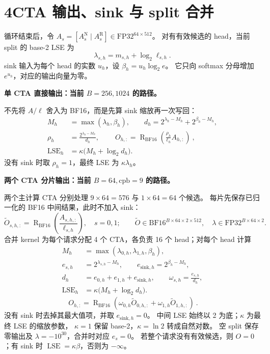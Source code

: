 \documentclass[UTF8,fontset=fandol,a4paper,10pt]{ctexart}
\newcommand{\BF}{\mathrm{BF16}}
\newcommand{\FP}{\mathrm{FP32}}
\newcommand{\RN}{\operatorname{R}_{\BF}}
\newcommand{\N}{\mathrm{N}}
\newcommand{\R}{\mathrm{R}}
\newcommand{\lse}{\operatorname{LSE}}
\begin{document}
\section*{4\quad CTA 输出、sink 与 split 合并}

循环结束后，令 $A_s=[A_s^{\N}\mid A_s^{\R}]\in\FP^{64\times512}$。
对有有效候选的 head，当前 split 的 base-2 LSE 为
\[
  \lambda_{s,h}=m_{s,h}+\log_2\ell_{s,h}.
\]
sink 输入为每个 head 的实数 $u_h$，设 $\beta_h=u_h\log_2e$。
它只向 softmax 分母增加 $e^{u_h}$，对应的输出向量为零。

\textbf{单 CTA 直接输出：当前 $B=256,1024$ 的路径。}

不先将 $A/\ell$ 舍入为 BF16，而是先算 sink 缩放再一次写回：
\begin{align*}
  M_h&=\max(\lambda_h,\beta_h),\qquad
  d_h=2^{\lambda_h-M_h}+2^{\beta_h-M_h},\\
  \rho_h&=\frac{2^{\lambda_h-M_h}}{d_h},\qquad
  \boxed{\ O_{h,:}=\RN\!\left(\frac{\rho_h}{\ell_h}A_{h,:}\right)\ },\\
  \lse_h&=\kappa\bigl(M_h+\log_2 d_h\bigr).
\end{align*}
没有 sink 时取 $\rho_h=1$，最终 LSE 为 $\kappa\lambda_h$。

\textbf{两个 CTA 分片输出：当前 $B=64,\mathrm{cpb}=9$ 的路径。}

两个主计算 CTA 分别处理 $9\times64=576$ 与 $1\times64=64$ 个候选。
每片先保存已归一化的 BF16 中间结果，此时不加入 sink：
\[
  \widetilde O_{s,h,:}=\RN\!\left(\frac{A_{s,h,:}}{\ell_{s,h}}\right),\quad s=0,1;
  \qquad
  \widetilde O\in\BF^{B\times64\times2\times512},\quad
  \lambda\in\FP^{B\times64\times2}.
\]
合并 kernel 为每个请求分配 4 个 CTA，各负责 16 个 head；对每个 head 计算
\begin{align*}
  M_h&=\max(\lambda_{0,h},\lambda_{1,h},\beta_h),\\
  e_{s,h}&=2^{\lambda_{s,h}-M_h},\qquad e_{\mathrm{sink},h}=2^{\beta_h-M_h},\\
  d_h&=e_{0,h}+e_{1,h}+e_{\mathrm{sink},h},\qquad
  \omega_{s,h}=\frac{e_{s,h}}{d_h},\\
  \lse_h&=\kappa\bigl(M_h+\log_2d_h\bigr).
\end{align*}
\[
  \boxed{\ O_{h,:}=\RN\!\left(\omega_{0,h}\widetilde O_{0,h,:}
                  +\omega_{1,h}\widetilde O_{1,h,:}\right)\ }.
\]
没有 sink 时去掉其最大值项，并取 $e_{\mathrm{sink},h}=0$。
中间 LSE 始终以 2 为底；$\kappa$ 为最终 LSE 的缩放参数，
$\kappa=1$ 保留 base-2，$\kappa=\ln2$ 转成自然对数。
空 split 保存零输出及 $\lambda=-10^{30}$，合并时对应 $e_s=0$。
若整个请求没有有效候选，则 $O=0$；有 sink 时 $\lse=\kappa\beta$，否则为 $-\infty$。
\end{document}
